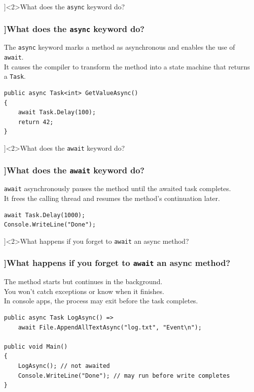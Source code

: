 \QuestionSlide[\CategoryBadge[PerfColor!20]{Async \& Threading}]<2>{What does the \texttt{async} keyword do?}

\begin{frame}[fragile]
  \frametitle{\AnswerTitle[\CategoryBadge[OOPColor!20]{C\#} ]{What does the \texttt{async} keyword do?}}

  {\footnotesize
  The \texttt{async} keyword marks a method as asynchronous and enables the use of \texttt{await}.\\
  It causes the compiler to transform the method into a state machine that returns a \texttt{Task}.
  }

  \begin{verbatim}
public async Task<int> GetValueAsync()
{
    await Task.Delay(100);
    return 42;
}
  \end{verbatim}
\end{frame}

\QuestionSlide[\CategoryBadge[PerfColor!20]{Async \& Threading}]<2>{What does the \texttt{await} keyword do?}

\begin{frame}[fragile]
  \frametitle{\AnswerTitle[\CategoryBadge[OOPColor!20]{C\#} ]{What does the \texttt{await} keyword do?}}

  {\footnotesize
  \texttt{await} asynchronously pauses the method until the awaited task completes.\\
  It frees the calling thread and resumes the method's continuation later.
  }

  \begin{verbatim}
await Task.Delay(1000);
Console.WriteLine("Done");
  \end{verbatim}
\end{frame}

\QuestionSlide[\CategoryBadge[PerfColor!20]{Async \& Threading}]<2>{What happens if you forget to \texttt{await} an async method?}

\begin{frame}[fragile]
  \frametitle{\AnswerTitle[\CategoryBadge[OOPColor!20]{C\#} ]{What happens if you forget to \texttt{await} an async method?}}

  {\footnotesize
  The method starts but continues in the background.\\
  You won't catch exceptions or know when it finishes.\\
  In console apps, the process may exit before the task completes.
  }

  \begin{verbatim}
public async Task LogAsync() =>
    await File.AppendAllTextAsync("log.txt", "Event\n");

public void Main()
{
    LogAsync(); // not awaited
    Console.WriteLine("Done"); // may run before write completes
}
  \end{verbatim}
\end{frame}

